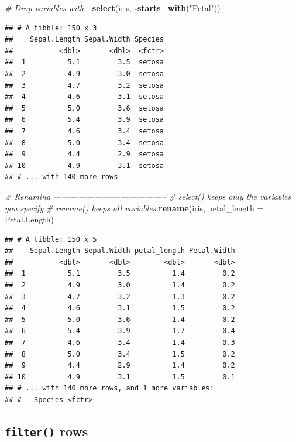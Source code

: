 \documentclass[]{book}
\newenvironment{Shaded}{\begin{snugshade}}{\end{snugshade}}
\newcommand{\KeywordTok}[1]{\textcolor[rgb]{0.13,0.29,0.53}{\textbf{#1}}}
\newcommand{\DataTypeTok}[1]{\textcolor[rgb]{0.13,0.29,0.53}{#1}}
\newcommand{\StringTok}[1]{\textcolor[rgb]{0.31,0.60,0.02}{#1}}
\newcommand{\CommentTok}[1]{\textcolor[rgb]{0.56,0.35,0.01}{\textit{#1}}}
\newcommand{\OperatorTok}[1]{\textcolor[rgb]{0.81,0.36,0.00}{\textbf{#1}}}
\newcommand{\NormalTok}[1]{#1}
\begin{document}
\begin{Shaded}
\begin{Highlighting}[]
\CommentTok{# Drop variables with -}
\KeywordTok{select}\NormalTok{(iris, }\OperatorTok{-}\KeywordTok{starts_with}\NormalTok{(}\StringTok{"Petal"}\NormalTok{))}
\end{Highlighting}
\end{Shaded}

\begin{verbatim}
## # A tibble: 150 x 3
##    Sepal.Length Sepal.Width Species
##           <dbl>       <dbl>  <fctr>
##  1          5.1         3.5  setosa
##  2          4.9         3.0  setosa
##  3          4.7         3.2  setosa
##  4          4.6         3.1  setosa
##  5          5.0         3.6  setosa
##  6          5.4         3.9  setosa
##  7          4.6         3.4  setosa
##  8          5.0         3.4  setosa
##  9          4.4         2.9  setosa
## 10          4.9         3.1  setosa
## # ... with 140 more rows
\end{verbatim}

\begin{Shaded}
\begin{Highlighting}[]
\CommentTok{# Renaming -----------------------------------------}
\CommentTok{# select() keeps only the variables you specify}
\CommentTok{# rename() keeps all variables}
\KeywordTok{rename}\NormalTok{(iris, }\DataTypeTok{petal_length =}\NormalTok{ Petal.Length)}
\end{Highlighting}
\end{Shaded}

\begin{verbatim}
## # A tibble: 150 x 5
##    Sepal.Length Sepal.Width petal_length Petal.Width
##           <dbl>       <dbl>        <dbl>       <dbl>
##  1          5.1         3.5          1.4         0.2
##  2          4.9         3.0          1.4         0.2
##  3          4.7         3.2          1.3         0.2
##  4          4.6         3.1          1.5         0.2
##  5          5.0         3.6          1.4         0.2
##  6          5.4         3.9          1.7         0.4
##  7          4.6         3.4          1.4         0.3
##  8          5.0         3.4          1.5         0.2
##  9          4.4         2.9          1.4         0.2
## 10          4.9         3.1          1.5         0.1
## # ... with 140 more rows, and 1 more variables:
## #   Species <fctr>
\end{verbatim}

\subsection{\texorpdfstring{\texttt{filter()}
rows}{filter() rows}}\label{filter-rows}
\end{document}
